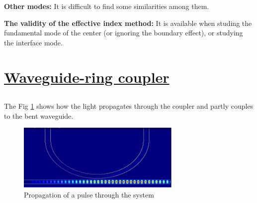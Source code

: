 \documentclass[fontsize=11pt]{scrartcl}
\begin{document}
\textbf{Other modes:} It is difficult to find some similarities among them.

\textbf{The validity of the effective index method:}
It is available when studing the fundamental mode of the center 
(or ignoring the boundary effect), or studying the interface mode.
\pagebreak
\section{\uline{Waveguide-ring coupler}}
\subsection{}
The Fig \ref{fig2.1} shows how the light propagates through the coupler and partly couples 
to the bent waveguide. 
\begin{figure}[H]
    \centering
     \includegraphics[width=0.7\textwidth]{img/fig2.1.png}
     \caption{Propagation of a pulse through the system}
     \label{fig2.1}
\end{figure} 
\end{document}
